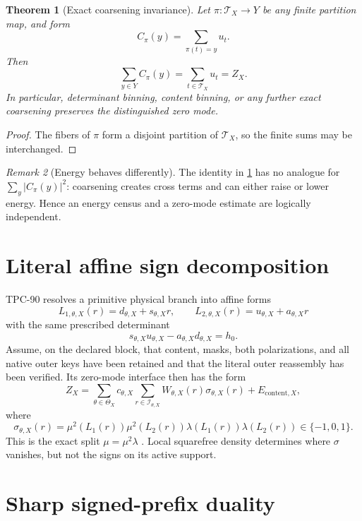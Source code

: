 \documentclass[11pt,a4paper]{article}
\newtheorem{theorem}{Theorem}[section]
\theoremstyle{definition}
\theoremstyle{remark}
\newtheorem{remark}[theorem]{Remark}
\newcommand{\cT}{\mathcal T}
\newcommand{\cI}{\mathcal I}
\begin{document}
\begin{theorem}[Exact coarsening invariance]
\label{thm:invariance}
Let \(\pi:\cT_X\to Y\) be any finite partition map, and form
\[
 C_\pi(y)=\sum_{\pi(t)=y}u_t.
\]
Then
\[
 \boxed{\sum_{y\in Y}C_\pi(y)=\sum_{t\in\cT_X}u_t=Z_X.}
\]
In particular, determinant binning, content binning, or any further
exact coarsening preserves the distinguished zero mode.
\end{theorem}

\begin{proof}
The fibers of \(\pi\) form a disjoint partition of \(\cT_X\), so the
finite sums may be interchanged.
\end{proof}

\begin{remark}[Energy behaves differently]
The identity in \cref{thm:invariance} has no analogue for
\(\sum_y|C_\pi(y)|^2\): coarsening creates cross terms and can either
raise or lower energy.  Hence an energy census and a zero-mode
estimate are logically independent.
\end{remark}

\section{Literal affine sign decomposition}

TPC-90 resolves a primitive physical branch into affine forms
\[
 L_{1,\theta,X}(r)=d_{\theta,X}+s_{\theta,X}r,\qquad
 L_{2,\theta,X}(r)=u_{\theta,X}+a_{\theta,X}r
\]
with the same prescribed determinant
\[
 s_{\theta,X}u_{\theta,X}
 -a_{\theta,X}d_{\theta,X}=h_0.
\]
Assume, on the declared block, that content, masks, both
polarizations, and all native outer keys have been retained and that
the literal outer reassembly has been verified.  Its zero-mode
interface then has the form
\begin{equation}
 Z_X
 =
 \sum_{\theta\in\Theta_X}
 c_{\theta,X}
 \sum_{r\in\cI_{\theta,X}}
 W_{\theta,X}(r)\sigma_{\theta,X}(r)
 +E_{\mathrm{content},X},
\label{eq:outer}
\end{equation}
where
\[
 \sigma_{\theta,X}(r)
 =
 \mu^2(L_1(r))\mu^2(L_2(r))
 \lambda(L_1(r))\lambda(L_2(r))
 \in\{-1,0,1\}.
\]
This is the exact split \(\mu=\mu^2\lambda\)
\citep{WangTPC90}.  Local squarefree density determines where
\(\sigma\) vanishes, but not the signs on its active support.

\section{Sharp signed-prefix duality}
\end{document}
